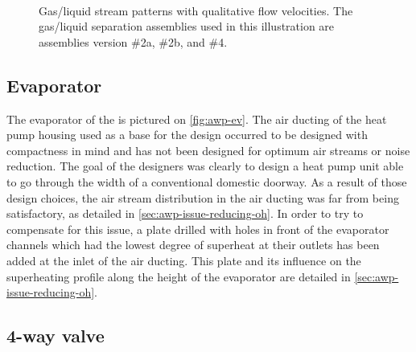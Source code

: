 \begin{figure}[htbp]
  \centering {}
  \hspace{1em} 
  \\
  \hspace{1em} 
  \hspace{1em} 
  \caption[Gas/liquid stream patterns with qualitative flow
  velocities]{Gas/liquid stream patterns with qualitative flow
    velocities. The gas/liquid separation assemblies used in this
    illustration are assemblies version \#2a, \#2b, and \#4.}
  \label{fig:awp-eco-flow-rates}
\end{figure}

\subsection{Evaporator}
\label{sec:awp-ev}

The evaporator of the \AWP{} is pictured on \cref{fig:awp-ev}. The air
ducting of the heat pump housing used as a base for the \AWP{} design
occurred to be designed with compactness in mind and has not been
designed for optimum air streams or noise reduction. The goal of the
designers was clearly to design a heat pump unit able to go through
the width of a conventional domestic doorway. As a result of those
design choices, the air stream distribution in the air ducting was far
from being satisfactory, as detailed in
\cref{sec:awp-issue-reducing-oh}. In order to try to compensate for
this issue, a plate drilled with holes in front of the evaporator
channels which had the lowest degree of superheat at their outlets has
been added at the inlet of the air ducting. This plate and its
influence on the superheating profile along the height of the
evaporator are detailed in \cref{sec:awp-issue-reducing-oh}.

\subsection{4-way valve}
\label{sec:awp-4way}

